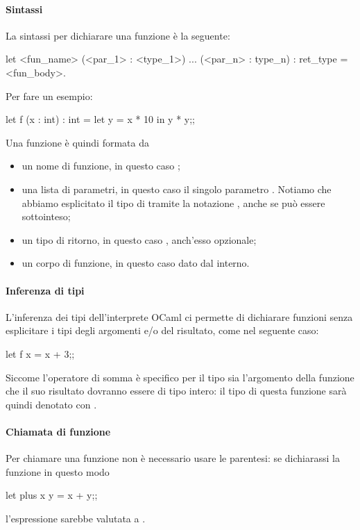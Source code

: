 \paragraph{Sintassi} La sintassi per dichiarare una funzione è la seguente:
\begin{OCaml}
    let <fun_name> (<par_1> : <type_1>) ... (<par_n> : type_n) : ret_type =
        <fun_body>.
\end{OCaml}
Per fare un esempio:
\begin{OCaml}
    let f (x : int) : int =
        let y = x * 10
            in y * y;;
\end{OCaml}
Una funzione è quindi formata da \begin{itemize}
    \item un nome di funzione, in questo caso ;
    \item una lista di parametri, in questo caso il singolo parametro . Notiamo che abbiamo esplicitato il tipo di  tramite la notazione , anche se può essere sottointeso;
    \item un tipo di ritorno, in questo caso , anch'esso opzionale;
    \item un corpo di funzione, in questo caso dato dal  interno.
\end{itemize}

\paragraph{Inferenza di tipi} L'inferenza dei tipi dell'interprete OCaml ci permette di dichiarare funzioni senza esplicitare i tipi degli argomenti e/o del risultato, come nel seguente caso:
\begin{OCaml}
    let f x = x + 3;;
\end{OCaml}
Siccome l'operatore di somma è specifico per il tipo  sia l'argomento della funzione che il suo risultato dovranno essere di tipo intero: il tipo di questa funzione sarà quindi denotato con .

\paragraph{Chiamata di funzione} Per chiamare una funzione non è necessario usare le parentesi: se dichiarassi la funzione  in questo modo
\begin{OCaml}
    let plus x y = x + y;;
\end{OCaml}
l'espressione  sarebbe valutata a . 

